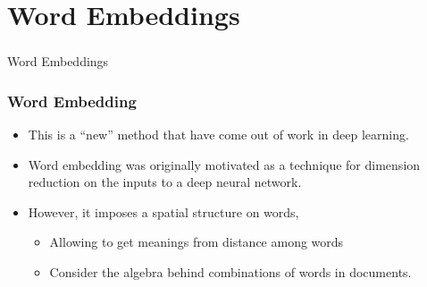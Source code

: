 \documentclass[
  shownotes,
  xcolor={svgnames},
  hyperref={colorlinks,citecolor=DarkBlue,linkcolor=DarkRed,urlcolor=DarkBlue}
  , aspectratio=169]{beamer}
\begin{document}
\section{Word Embeddings}
\begin{frame}[fragile]
\frametitle{}


\centering
{\huge \textcolor{andesred}{Word Embeddings}}


\end{frame}

\begin{frame}
\frametitle{Word Embedding }

\begin{itemize}
\item This is a ``new'' method  that have come out of work in deep learning. 
\medskip
\item Word embedding was originally motivated as a technique for dimension reduction on the inputs to a deep neural network. 
\medskip
\medskip
\item However,  it imposes a spatial structure on words,

\begin{itemize}
 \item Allowing to get  meanings from distance among words
 \medskip
 \item Consider the algebra behind combinations of words in documents. 
 \end{itemize} 


\end{itemize}




\end{frame}
\end{document}
